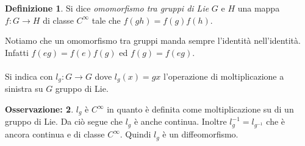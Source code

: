 \documentclass[12pt,a4paper]{report}
\theoremstyle{definition}
\newtheorem{Def}{Definizione}[chapter]
\theoremstyle{Theorem}
\theoremstyle{definition}
\theoremstyle{definition}
\theoremstyle{definition}
\newtheorem{Obs}[Def]{Osservazione:}
\begin{document}
\begin{Def}
	Si dice \textit{omomorfismo tra gruppi di Lie} $G$ e $H$ una mappa \\$f:G\rightarrow H$ di classe $C^\infty$ tale che $f(gh)=f(g)f(h)$.
\end{Def}
Notiamo che un omomorfismo tra gruppi manda sempre l'identità nell'identità. Infatti $f(eg)=f(e)f(g)$ ed $f(g)=f(eg)$.\\\\
Si indica con $l_g:G\rightarrow G$ dove $l_g(x)=gx$ l'operazione di moltiplicazione a sinistra su $G$ gruppo di Lie.
\begin{Obs}
	$l_g$ è $C^\infty$ in quanto è definita come moltiplicazione su di un gruppo di Lie. Da ciò segue che $l_g$ è anche continua. Inoltre $l_g^{-1}=l_{g^{-1}}$ che è ancora continua e di classe $C^\infty$. Quindi $l_g$ è un diffeomorfismo.
\end{Obs}
\end{document}

